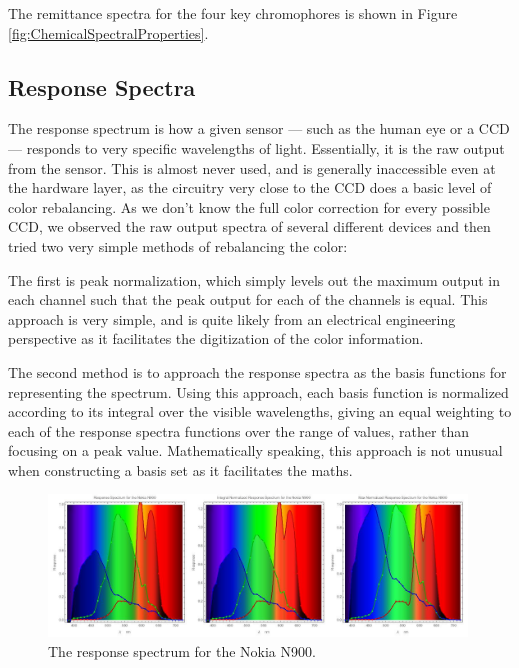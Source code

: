 The remittance spectra for the four key chromophores is shown in Figure \ref{fig:ChemicalSpectralProperties}. 

\subsection{Response Spectra}

The response spectrum is how a given sensor --- such as the human eye or a CCD --- responds to very specific wavelengths of light. Essentially, it is the raw output from the sensor. This is almost never used, and is generally inaccessible even at the hardware layer, as the circuitry very close to the CCD does a basic level of color rebalancing. As we don't know the full color correction for every possible CCD, we observed the raw output spectra of several different devices and then tried two very simple methods of rebalancing the color:

The first is peak normalization, which simply levels out the maximum output in each channel such that the peak output for each of the channels is equal. This approach is very simple, and is quite likely from an electrical engineering perspective as it facilitates the digitization of the color information.

The second method is to approach the response spectra as the basis functions for representing the spectrum. Using this approach, each basis function is normalized according to its integral over the visible wavelengths, giving an equal weighting to each of the response spectra functions over the range of values, rather than focusing on a peak value. Mathematically speaking, this approach is not unusual when constructing a basis set as it facilitates the maths.

\begin{figure}[h!]
  \centering
    \includegraphics[width=0.99\textwidth]{Chapter1/Figs/ResponseSpectrum_NokiaN900.jpg}
    \caption{The response spectrum for the Nokia N900. }  \label{fig:ResponseSpectumNokia}
\end{figure}



